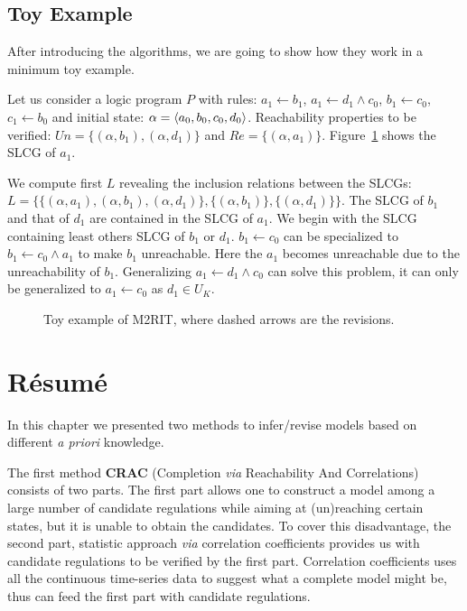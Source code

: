     
\subsection{Toy Example}    
After introducing the algorithms, we are going to show how they work in a minimum toy example.

\begin{example}
Let us consider a logic program $P$ with rules: $a_1\gets b_1$, $a_1\gets d_1 \land c_0$, $b_1\gets c_0$, $c_1\gets b_0$ and initial state: $\alpha=\langle a_0,b_0,c_0,d_0\rangle$.
Reachability properties to be verified: $Un=\{(\alpha,b_1),(\alpha,d_1)\}$ and $Re=\{(\alpha,a_1)\}$.
Figure~\ref{fig:toyExampleM2RIT} shows the SLCG of $a_1$.

We compute first $L$ revealing the inclusion relations between the SLCGs: $L=\{\{(\alpha,a_1),(\alpha,b_1),(\alpha,d_1)\},\{(\alpha,b_1)\},\{(\alpha,d_1)\}\}$.
The SLCG of $b_1$ and that of $d_1$ are contained in the SLCG of $a_1$.
We begin with the SLCG containing least others SLCG of $b_1$ or $d_1$.
$b_1\gets c_0$ can be specialized to $b_1\gets c_0\land a_1$ to make $b_1$ unreachable.
Here the $a_1$ becomes unreachable due to the unreachability of $b_1$.
Generalizing $a_1\gets d_1 \land c_0$ can solve this problem, it can only be generalized to $a_1 \gets c_0$ as $d_1\in U_K$.
\end{example}
    \begin{figure}[ht]
        \centering
        
        \caption[Toy example of M2RIT]{Toy example of M2RIT, where dashed arrows are the revisions.}
        \label{fig:toyExampleM2RIT}
    \end{figure}
\section{R\'esum\'e}
In this chapter we presented two methods to infer/revise models based on different \textit{a priori} knowledge.

The first method \textbf{CRAC} (Completion \textit{via} Reachability And Correlations) consists of two parts.
The first part allows one to construct a model among a large number of candidate regulations while aiming at (un)reaching certain states, but it is unable to obtain the candidates.
To cover this disadvantage, the second part, statistic approach \textit{via} correlation coefficients provides us with candidate regulations to be verified by the first part.
Correlation coefficients uses all the continuous time-series data to suggest what a complete model might be, thus can feed the first part with candidate regulations.


